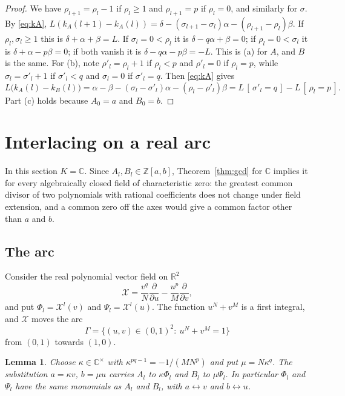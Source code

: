 \documentclass[11pt]{amsart}
\newtheorem{lemma}[theorem]{Lemma}
\theoremstyle{definition}
\theoremstyle{remark}
\numberwithin{equation}{section}
\newcommand{\Z}{\mathbb{Z}}
\newcommand{\R}{\mathbb{R}}
\newcommand{\C}{\mathbb{C}}
\newcommand{\ind}[1]{[\,#1\,]}
\begin{document}
\begin{proof}
We have $\rho_{l+1}=\rho_l-1$ if $\rho_l\ge1$ and $\rho_{l+1}=p$ if $\rho_l=0$, and similarly for $\sigma$. By \eqref{eq:kA}, $L(k_A(l+1)-k_A(l))=\delta-(\sigma_{l+1}-\sigma_l)\alpha-(\rho_{l+1}-\rho_l)\beta$. If $\rho_l,\sigma_l\ge1$ this is $\delta+\alpha+\beta=L$. If $\sigma_l=0<\rho_l$ it is $\delta-q\alpha+\beta=0$; if $\rho_l=0<\sigma_l$ it is $\delta+\alpha-p\beta=0$; if both vanish it is $\delta-q\alpha-p\beta=-L$. This is (a) for $A$, and $B$ is the same. For (b), note $\rho'_l=\rho_l+1$ if $\rho_l<p$ and $\rho'_l=0$ if $\rho_l=p$, while $\sigma_l=\sigma'_l+1$ if $\sigma'_l<q$ and $\sigma_l=0$ if $\sigma'_l=q$. Then \eqref{eq:kA} gives
\[
L\bigl(k_A(l)-k_B(l)\bigr)=\alpha-\beta-(\sigma_l-\sigma'_l)\alpha-(\rho_l-\rho'_l)\beta=L\,\ind{\sigma'_l=q}-L\,\ind{\rho_l=p}.
\]
Part (c) holds because $A_0=a$ and $B_0=b$.
\end{proof}

\section{Interlacing on a real arc}\label{sec:interlacing}

In this section $K=\C$. Since $A_l,B_l\in\Z[a,b]$, Theorem~\ref{thm:gcd} for $\C$ implies it for every algebraically closed field of characteristic zero: the greatest common divisor of two polynomials with rational coefficients does not change under field extension, and a common zero off the axes would give a common factor other than $a$ and $b$.

\subsection{The arc}
Consider the real polynomial vector field on $\R^2$
\[
\mathcal X=\frac{v^q}{N}\frac{\partial}{\partial u}-\frac{u^p}{M}\frac{\partial}{\partial v},
\]
and put $\Phi_l=\mathcal X^l(v)$ and $\Psi_l=\mathcal X^l(u)$. The function $u^N+v^M$ is a first integral, and $\mathcal X$ moves the arc
\[
\Gamma=\{(u,v)\in(0,1)^2:\ u^N+v^M=1\}
\]
from $(0,1)$ towards $(1,0)$.

\begin{lemma}\label{lem:transport}
Choose $\kappa\in\C^\times$ with $\kappa^{pq-1}=-1/(MN^p)$ and put $\mu=N\kappa^q$. The substitution $a=\kappa v$, $b=\mu u$ carries $A_l$ to $\kappa\Phi_l$ and $B_l$ to $\mu\Psi_l$. In particular $\Phi_l$ and $\Psi_l$ have the same monomials as $A_l$ and $B_l$, with $a\leftrightarrow v$ and $b\leftrightarrow u$.
\end{lemma}
\end{document}
